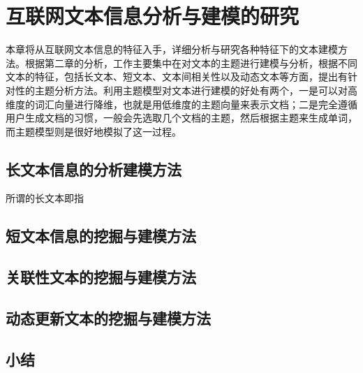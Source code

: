 \section{互联网文本信息分析与建模的研究}
本章将从互联网文本信息的特征入手，详细分析与研究各种特征下的文本建模方法。根据第二章的分析，工作主要集中在对文本的主题进行建模与分析，根据不同文本的特征，包括长文本、短文本、文本间相关性以及动态文本等方面，提出有针对性的主题分析方法。利用主题模型对文本进行建模的好处有两个，一是可以对高维度的词汇向量进行降维，也就是用低维度的主题向量来表示文档；二是完全遵循用户生成文档的习惯，一般会先选取几个文档的主题，然后根据主题来生成单词，而主题模型则是很好地模拟了这一过程。

\subsection{长文本信息的分析建模方法}
所谓的长文本即指

\subsection{短文本信息的挖掘与建模方法}

\subsection{关联性文本的挖掘与建模方法}

\subsection{动态更新文本的挖掘与建模方法}

\subsection{小结}
